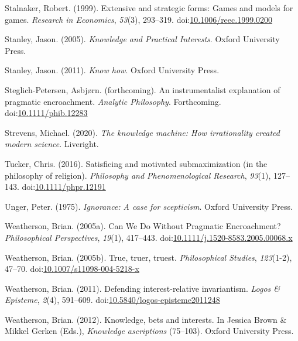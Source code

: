 \documentclass[
  12pt,
  letterpaper,
]{scrbook}
\newlength{\cslhangindent}
\newenvironment{CSLReferences}[2] %
 {\begin{list}{}{%
  \setlength{\itemindent}{0pt}
  \setlength{\leftmargin}{0pt}
  \setlength{\parsep}{0pt}
  \ifodd #1
   \setlength{\leftmargin}{\cslhangindent}
   \setlength{\itemindent}{-1\cslhangindent}
  \fi
  \setlength{\itemsep}{#2\baselineskip}}}
 {\end{list}}
\begin{document}
\begin{CSLReferences}{1}{0}
Stalnaker, Robert. (1999). Extensive and strategic forms: Games and
models for games. \emph{Research in Economics}, \emph{53}(3), 293--319.
doi:\href{https://doi.org/10.1006/reec.1999.0200}{10.1006/reec.1999.0200}

Stanley, Jason. (2005). \emph{{Knowledge and Practical Interests}}.
Oxford University Press.

Stanley, Jason. (2011). \emph{Know how}. Oxford University Press.

Steglich-Petersen, Asbjørn. (forthcoming). An instrumentalist
explanation of pragmatic encroachment. \emph{Analytic Philosophy}.
Forthcoming.
doi:\href{https://doi.org/10.1111/phib.12283}{10.1111/phib.12283}

Strevens, Michael. (2020). \emph{The knowledge machine: How
irrationality created modern science}. Liveright.

Tucker, Chris. (2016). Satisficing and motivated submaximization (in the
philosophy of religion). \emph{Philosophy and Phenomenological
Research}, \emph{93}(1), 127--143.
doi:\href{https://doi.org/10.1111/phpr.12191}{10.1111/phpr.12191}

Unger, Peter. (1975). \emph{Ignorance: A case for scepticism}. Oxford
University Press.

Weatherson, Brian. (2005a). {Can We Do Without Pragmatic Encroachment?}
\emph{Philosophical Perspectives}, \emph{19}(1), 417--443.
doi:\href{https://doi.org/10.1111/j.1520-8583.2005.00068.x}{10.1111/j.1520-8583.2005.00068.x}

Weatherson, Brian. (2005b). True, truer, truest. \emph{Philosophical
Studies}, \emph{123}(1-2), 47--70.
doi:\href{https://doi.org/10.1007/s11098-004-5218-x}{10.1007/s11098-004-5218-x}

Weatherson, Brian. (2011). Defending interest-relative invariantism.
\emph{Logos \& Episteme}, \emph{2}(4), 591--609.
doi:\href{https://doi.org/10.5840/logos-episteme2011248}{10.5840/logos-episteme2011248}

Weatherson, Brian. (2012). Knowledge, bets and interests. In Jessica
Brown \& Mikkel Gerken (Eds.), \emph{Knowledge ascriptions} (75--103).
Oxford University Press.


\end{CSLReferences}
\end{document}
